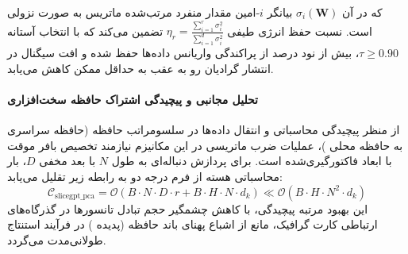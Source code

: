 که در آن $\sigma_i(\mathbf{W})$ بیانگر $i$-امین مقدار منفرد مرتب‌شده ماتریس به صورت نزولی است. نسبت حفظ انرژی طیفی $\eta_r = \frac{\sum_{i=1}^r \sigma_i^2}{\sum_{i=1}^{d} \sigma_i^2}$ تضمین می‌کند که با انتخاب آستانه $\tau \ge 0.90$، بیش از نود درصد از پراکندگی واریانس داده‌ها حفظ شده و افت سیگنال در انتشار گرادیان رو به عقب به حداقل ممکن کاهش می‌یابد.

\paragraph{تحلیل مجانبی و پیچیدگی اشتراک حافظه سخت‌افزاری}
از منظر پیچیدگی محاسباتی و انتقال داده‌ها در سلسومراتب حافظه (حافظه سراسری  به حافظه محلی )، عملیات ضرب ماتریسی در این مکانیزم نیازمند تخصیص بافر موقت با ابعاد فاکتورگیری‌شده است. برای پردازش دنباله‌ای به طول $N$ با بعد مخفی $D$، بار محاسباتی هسته از فرم درجه دو به رابطه زیر تقلیل می‌یابد:
\begin{equation}
\label{eq:complexity_slicegpt_pca}
\mathcal{C}_{\text{slicegpt\_pca}} = \mathcal{O}\left( B \cdot N \cdot D \cdot r + B \cdot H \cdot N \cdot d_k \right) \ll \mathcal{O}\left( B \cdot H \cdot N^2 \cdot d_k \right)
\end{equation}
این بهبود مرتبه پیچیدگی، با کاهش چشمگیر حجم تبادل تانسورها در گذرگاه‌های ارتباطی کارت گرافیک، مانع از اشباع پهنای باند حافظه (پدیده ) در فرآیند استنتاج طولانی‌مدت می‌گردد.
